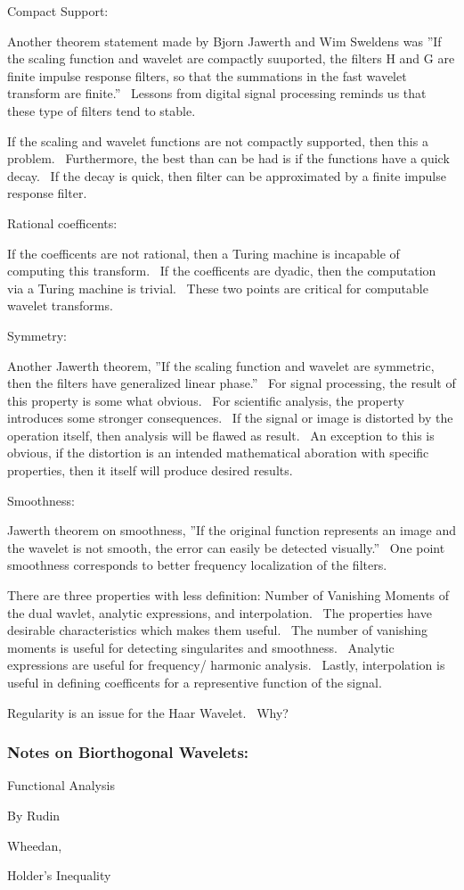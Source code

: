 \documentclass{article}
\begin{document}
Compact Support:

Another theorem statement made by Bjorn Jawerth and Wim Sweldens was ''If
the scaling function and wavelet are compactly suuported, the filters H and
G are finite impulse response filters, so that the summations in the fast
wavelet transform are finite.'' \ Lessons from digital signal processing
reminds us that these type of filters tend to stable. \ 

If the scaling and wavelet functions are not compactly supported, then this
a problem. \ Furthermore, the best than can be had is if the functions have
a quick decay. \ If the decay is quick, then filter can be approximated by a
finite impulse response filter. \ 

\bigskip

Rational coefficents:

If the coefficents are not rational, then a Turing machine is incapable of
computing this transform. \ If the coefficents are dyadic, then the
computation via a Turing machine is trivial. \ These two points are critical
for computable wavelet transforms. \ 

\bigskip

Symmetry:

Another Jawerth theorem, ''If the scaling function and wavelet are
symmetric, then the filters have generalized linear phase.'' \ For signal
processing, the result of this property is some what obvious. \ For
scientific analysis, the property introduces some stronger consequences. \
If the signal or image is distorted by the operation itself, then analysis
will be flawed as result. \ An exception to this is obvious, if the
distortion is an intended mathematical aboration with specific properties,
then it itself will produce desired results.

\bigskip

Smoothness:

Jawerth theorem on smoothness, ''If the original function represents an
image and the wavelet is not smooth, the error can easily be detected
visually.'' \ One point smoothness corresponds to better frequency
localization of the filters.

\bigskip

There are three properties with less definition: Number of Vanishing Moments
of the dual wavlet, analytic expressions, and interpolation. \ The
properties have desirable characteristics which makes them useful. \ The
number of vanishing moments is useful for detecting singularites and
smoothness. \ Analytic expressions are useful for frequency/ harmonic
analysis. \ Lastly, interpolation is useful in defining coefficents for a
representive function of the signal. \ 

\bigskip

Regularity is an issue for the Haar Wavelet. \ Why?

\bigskip

\subsubsection{Notes on Biorthogonal Wavelets:}

\bigskip

\bigskip

Functional Analysis

By Rudin

Wheedan,

Holder's Inequality
\end{document}
